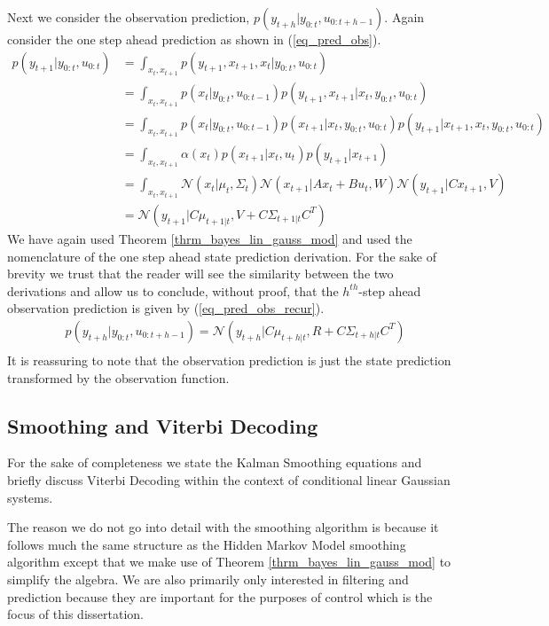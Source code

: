 Next we consider the observation prediction, $p(y_{t+h}|y_{0:t}, u_{0:t+h-1})$. Again consider the one step ahead prediction as shown in (\ref{eq_pred_obs}).
\begin{equation}
\begin{aligned}
p(y_{t+1}|y_{0:t}, u_{0:t}) &= \int_{x_t, x_{t+1}} p(y_{t+1},x_{t+1},x_t|y_{0:t}, u_{0:t}) \\
&= \int_{x_t, x_{t+1}} p(x_t|y_{0:t}, u_{0:t-1})p(y_{t+1},x_{t+1}|x_t, y_{0:t}, u_{0:t}) \\
&= \int_{x_t, x_{t+1}} p(x_t|y_{0:t}, u_{0:t-1}) p(x_{t+1}|x_t, y_{0:t}, u_{0:t})p(y_{t+1}|x_{t+1}, x_t, y_{0:t}, u_{0:t}) \\
&= \int_{x_t, x_{t+1}} \alpha(x_t) p(x_{t+1}|x_t, u_{t}) p(y_{t+1}|x_{t+1}) \\
&= \int_{x_t, x_{t+1}} \mathcal{N}(x_t|\mu_t,\Sigma_t) \mathcal{N}(x_{t+1}|Ax_t+Bu_t, W) \mathcal{N}(y_{t+1}|Cx_{t+1}, V) \\
&= \mathcal{N}(y_{t+1}|C\mu_{t+1|t}, V+C\Sigma_{t+1|t}C^T)
\end{aligned}
\label{eq_pred_obs}
\end{equation}
We have again used Theorem \ref{thrm_bayes_lin_gauss_mod} and used the nomenclature of the one step ahead state prediction derivation. For the sake of brevity we trust that the reader will see the similarity between the two derivations and allow us to conclude, without proof, that the $h^{th}$-step ahead observation prediction is given by (\ref{eq_pred_obs_recur}).
\begin{equation}
\begin{aligned}
&p(y_{t+h}|y_{0:t}, u_{0:t+h-1}) = \mathcal{N}(y_{t+h}|C\mu_{t+h|t}, R+C\Sigma_{t+h|t}C^T) \\
\end{aligned}
\label{eq_pred_obs_recur}
\end{equation}
It is reassuring to note that the observation prediction is just the state prediction transformed by the observation function.

\subsection{Smoothing and Viterbi Decoding}
For the sake of completeness we state the Kalman Smoothing equations and briefly discuss Viterbi Decoding within the context of conditional linear Gaussian systems. 

The reason we do not go into detail with the smoothing algorithm is because it follows much the same structure as the Hidden Markov Model smoothing algorithm except that we make use of Theorem \ref{thrm_bayes_lin_gauss_mod} to simplify the algebra. We are also primarily only interested in filtering and prediction because they are important for the purposes of control which is the focus of this dissertation.

